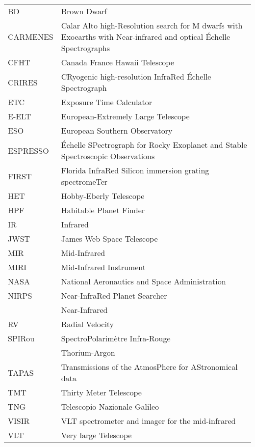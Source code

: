 \begin{abbreviations}

               \begin{longtable}{ll}
                BD & Brown Dwarf \\
                {CARMENES} & Calar Alto high-Resolution search for M dwarfs with Exoearths with Near-infrared and optical \'Echelle Spectrographs \\
                CFHT & Canada France Hawaii Telescope \\
                {CRIRES} & CRyogenic high-resolution InfraRed \'Echelle Spectrograph \\
                ETC & Exposure Time Calculator \\
                E-ELT & European-Extremely Large Telescope \\
                {ESO} & European Southern Observatory \\
                ESPRESSO & \'Echelle SPectrograph for Rocky Exoplanet and Stable Spectroscopic Observations\\
                FIRST & Florida InfraRed Silicon immersion grating spectromeTer \\
                HET & Hobby-Eberly Telescope \\
                HPF & Habitable Planet Finder \\
                IR & Infrared\\
                JWST & James Web Space Telescope \\
                MIR & Mid-Infrared \\
                MIRI & Mid-Infrared Instrument\\
                NASA & National Aeronautics and Space Administration \\
                NIRPS & Near-InfraRed Planet Searcher \\
                \nir{} & Near-Infrared \\
                RV & Radial Velocity\\
                SPIRou & SpectroPolarim\`etre Infra-Rouge\\
                \thar{} & Thorium-Argon\\
                TAPAS & Transmissions of the AtmosPhere for AStronomical data\\
                TMT & Thirty Meter Telescope\\
                TNG & Telescopio Nazionale Galileo \\
                VISIR &  VLT spectrometer and imager for the mid-infrared \\
                VLT & Very large Telescope \\
                \end{longtable}
\end{abbreviations}
